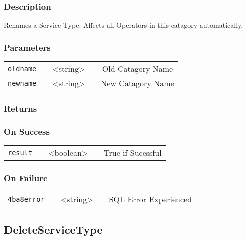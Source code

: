 \documentclass[a4paper,12pt]{article}
\begin{document}
\subsubsection{Description}

Renames a Service Type. Affects all Operators in this catagory
automatically. 

\subsubsection{Parameters}

\begin{tabular}{ccccc}
\verb!oldname! & \vspace{15mm} & <string> & \vspace{15mm} & Old Catagory Name \\
\verb!newname! & \vspace{15mm} & <string> & \vspace{15mm} & New Catagory Name \\
\end{tabular}

\subsubsection{Returns}

\subsubsection{On Success}

\begin{tabular}{ccccc}
\verb!result! & \vspace{15mm} & <boolean> & \vspace{15mm} & True if Sucessful \\
\end{tabular}

\subsubsection{On Failure}

\begin{tabular}{ccccc}
\verb!4ba8error! & \vspace{15mm} & <string> & \vspace{15mm} & SQL Error Experienced \\
\end{tabular}


\subsection{DeleteServiceType}
\end{document}
